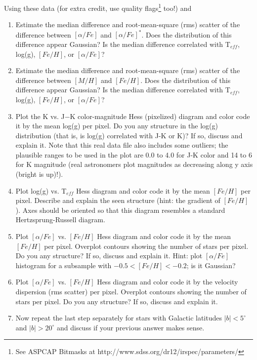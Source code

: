 Using these data (for extra credit, use quality flags\footnote{See ASPCAP Bitmasks at http://www.sdss.org/dr12/irspec/parameters/} too!) and 
\begin{enumerate}
\item Estimate the median difference and root-mean-square (rms) scatter of the difference between $[\alpha/Fe]$ and $[\alpha/Fe]^\ast$. Does the distribution of this difference appear Gaussian? Is the median difference correlated with T$_{eff}$, log(g), $[Fe/H]$, or $[\alpha/Fe]$? 
\item Estimate the median difference and root-mean-square (rms) scatter of the difference between $[M/H]$ and $[Fe/H]$. 
Does the distribution of this difference appear Gaussian? 
Is the median difference correlated with T$_{eff}$, log(g), $[Fe/H]$, or $[\alpha/Fe]$? 
\item Plot the K vs. J$-$K color-magnitude Hess (pixelized) diagram and color code it by the mean log(g) per pixel.
Do you any structure in the log(g) distribution (that is, is log(g) correlated with J-K or K)? If so, discuss and explain it. 
Note that this real data file also includes some outliers; the plausible ranges to be used in the plot are 0.0 to 4.0 for 
J-K color and 14 to 6 for K magnitude (real astronomers plot magnitudes as decreasing along y axis (bright is up)!). 
\item Plot log(g) vs. T$_{eff}$ Hess diagram and color code it by the mean $[Fe/H]$ per pixel.
Describe and explain the seen structure (hint: the gradient of $[Fe/H]$). Axes should be oriented so that 
this diagram resembles a standard Hertzsprung-Russell diagram.  
\item Plot $[\alpha/Fe]$ vs. $[Fe/H]$ Hess diagram and color code it by the mean $[Fe/H]$ per pixel.
Overplot contours showing the number of stars per pixel. Do you any structure? If so, discuss and explain it. 
Hint: plot $[\alpha/Fe]$ histogram for a subsample with $-0.5 < [Fe/H] < -0.2$; is it Gaussian? 
\item Plot $[\alpha/Fe]$ vs. $[Fe/H]$ Hess diagram and color code it by the velocity dispersion (rms scatter) per pixel.
Overplot contours showing the number of stars per pixel. Do you any structure? If so, discuss and explain it. 
\item Now repeat the last step separately for stars with Galactic latitudes $|b| < 5^\circ$ and $|b| > 20^\circ$ and 
discuss if your previous answer makes sense.  
\end{enumerate}


